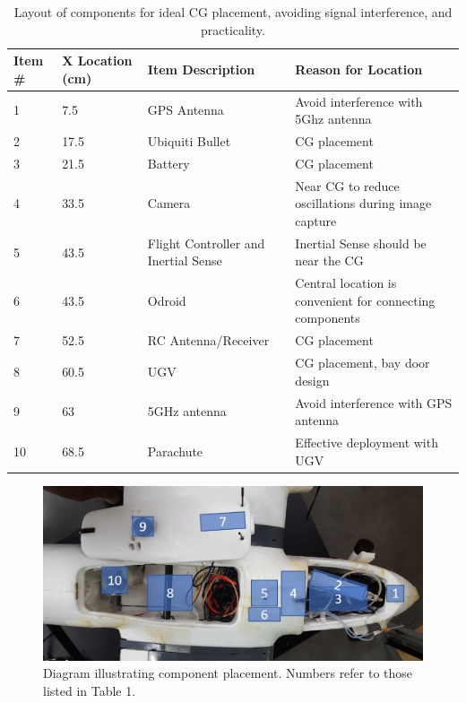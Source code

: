 \documentclass[]{auvsi_doc}
\begin{document}
	\begin{table}[h!]
		\begin{center}
			\caption{Layout of components for ideal CG placement, avoiding signal interference, and practicality.}
			\label{table:components}
			\begin{tabular}{p{1cm}p{2.5cm}p{4cm}p{7cm}}
				\toprule
				Item \# & X Location (cm) & Item Description & Reason for Location \\
				\midrule
				1 & 7.5 & GPS Antenna & Avoid interference with 5Ghz antenna \\
				2 & 17.5 & Ubiquiti Bullet & CG placement \\
				3 & 21.5 & Battery & CG placement \\
				4 & 33.5 & Camera & Near CG to reduce oscillations during image capture \\
				5 & 43.5 & Flight Controller and Inertial Sense & Inertial Sense should be near the CG  \\
				6 & 43.5 & Odroid & Central location is convenient for \newline connecting components \\
				7 & 52.5 & RC Antenna/Receiver & CG placement \\
				8 & 60.5 & UGV & CG placement, bay door design \\
				9 & 63 & 5GHz antenna & Avoid interference with GPS antenna \\
				10 & 68.5 & Parachute & Effective deployment with UGV \\
				\bottomrule
			\end{tabular}
		\end{center}
	\end{table}
	
	\begin{figure}[h!]
		\centering
		\includegraphics[width=.9\columnwidth]{figs/ComponentsPlacement.png}
		\caption{Diagram illustrating component placement. Numbers refer to those listed in Table 1.}
		\label{fig:components}
	\end{figure}
	
	
\end{document}
